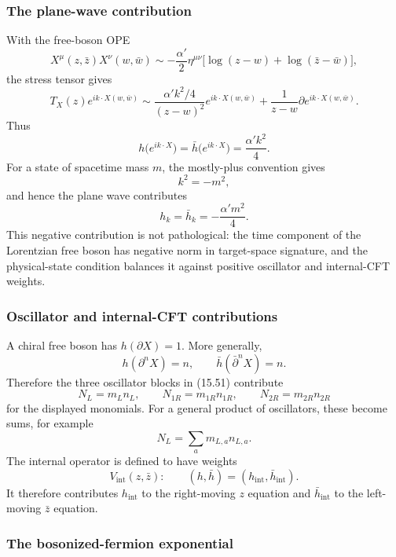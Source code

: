 \documentclass[
  10pt,
  a4paper,
  openany]{book}
\begin{document}
\subsubsection{The plane-wave
contribution}\label{the-plane-wave-contribution}

With the free-boson OPE \[
X^\mu(z,\bar z)X^\nu(w,\bar w)
\sim
-\frac{\alpha'}2\eta^{\mu\nu}
\bigl[\log(z-w)+\log(\bar z-\bar w)\bigr],
\] the stress tensor gives \[
T_X(z)e^{ik\cdot X(w,\bar w)}
\sim
\frac{\alpha'k^2/4}{(z-w)^2}e^{ik\cdot X(w,\bar w)}
+\frac1{z-w}\partial e^{ik\cdot X(w,\bar w)}.
\] Thus \[
h\bigl(e^{ik\cdot X}\bigr)
=
\bar h\bigl(e^{ik\cdot X}\bigr)
=
\frac{\alpha'k^2}{4}.
\] For a state of spacetime mass \(m\), the mostly-plus convention gives
\[
k^2=-m^2,
\] and hence the plane wave contributes \[
\boxed{
h_k=\bar h_k=-\frac{\alpha'm^2}{4}.
}
\] This negative contribution is not pathological: the time component of
the Lorentzian free boson has negative norm in target-space signature,
and the physical-state condition balances it against positive oscillator
and internal-CFT weights.

\subsubsection{Oscillator and internal-CFT
contributions}\label{oscillator-and-internal-cft-contributions}

A chiral free boson has \(h(\partial X)=1\). More generally, \[
h(\partial^nX)=n,
\qquad
\bar h(\bar\partial^nX)=n.
\] Therefore the three oscillator blocks in (15.51) contribute \[
N_L=m_Ln_L,
\qquad
N_{1R}=m_{1R}n_{1R},
\qquad
N_{2R}=m_{2R}n_{2R}
\] for the displayed monomials. For a general product of oscillators,
these become sums, for example \[
N_L=\sum_a m_{L,a}n_{L,a}.
\] The internal operator is defined to have weights \[
V_{\mathrm{int}}(z,\bar z):\qquad
(h,\bar h)=(h_{\mathrm{int}},\bar h_{\mathrm{int}}).
\] It therefore contributes \(h_{\mathrm{int}}\) to the right-moving
\(z\) equation and \(\bar h_{\mathrm{int}}\) to the left-moving
\(\bar z\) equation.

\subsubsection{The bosonized-fermion
exponential}\label{the-bosonized-fermion-exponential}
\end{document}
